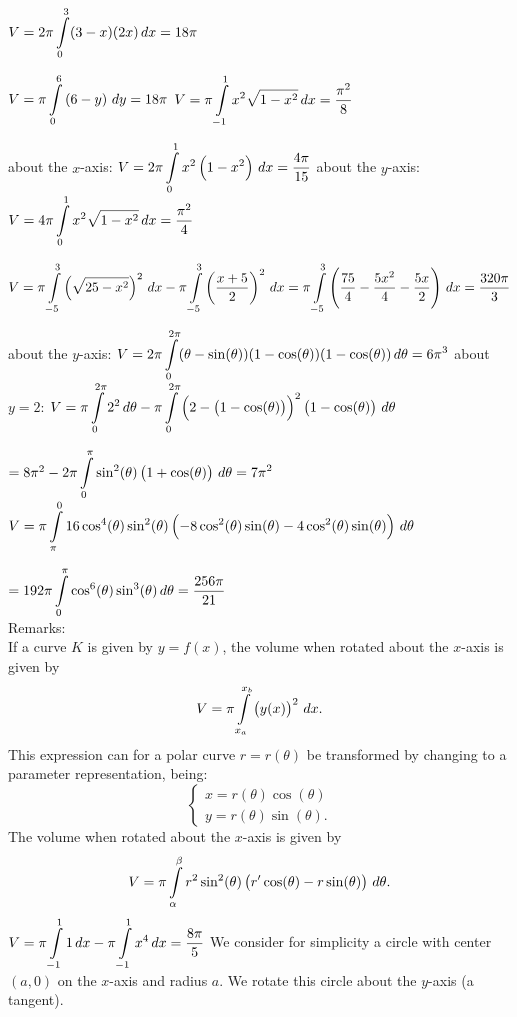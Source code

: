 \begin{Answer}
    
    \Question $V = 2\pi \displaystyle \int\limits_{0}^{3}(3-x)(2x) \, dx = 18 \pi $ 
    
    \ifcalculus
    \Question $V = \pi \displaystyle \int\limits_{0}^{6} \left(6-y\right) \, dy = 18 \pi$
    \Question $V= \pi \displaystyle \int\limits_{-1}^{1} x^2 \sqrt{1-x^2} \, dx = \dfrac{\pi^2}{8}$
    \fi
    
    \Question \subQuestion about the $x$-axis: $V = 2 \pi \displaystyle \int\limits_{0}^{1} x^2\left(1-x^2 \right) \, dx = \dfrac{4\pi}{15} $
    \subQuestion about the $y$-axis: $V = 4 \pi \displaystyle \int\limits_{0}^{1} x^2\sqrt{1-x^2} \, dx = \dfrac{\pi^2}{4} $  
    
    \ifcalculus
    \Question $V = \pi \displaystyle \int\limits_{-5}^{3}\left(\sqrt{25-x^2}\right)^2 \, dx - \pi \displaystyle \int\limits_{-5}^{3} \left(\dfrac{x+5}{2} \right)^2 \, dx =  \pi \displaystyle \int\limits_{-5}^{3}\left(\dfrac{75}{4} - \dfrac{5x^2}{4} - \dfrac{5x}{2} \right) \, dx = \dfrac{320 \pi}{3}  $
    
    \Question \subQuestion about the $y$-axis: $V = 2 \pi \displaystyle \int\limits_{0}^{2\pi} (\theta - \sin(\theta))(1-\cos(\theta))(1-\cos(\theta))  \, d\theta  = 6\pi^3$
    \subQuestion about $y=2$: $V = \pi \displaystyle \int\limits_{0}^{2\pi} 2^2 \, d\theta-  \pi \displaystyle \int\limits_{0}^{2\pi} \left( 2 - \left(1-\cos(\theta)\right) \right)^2\left(1-\cos(\theta)\right)  \, d\theta $ \par
    \hspace{3cm} $= 8 \pi^2 - 2 \pi \displaystyle \int\limits_{0}^{\pi} \sin^2(\theta)\left(1+\cos(\theta)\right)  \, d\theta = 7 \pi^2$
    \Question $V = 
    \pi \displaystyle \int\limits_{\pi}^{0} 16 \cos^4(\theta)\sin^2(\theta) \left( -8 \cos^2(\theta)\sin(\theta) -4 \cos^2(\theta)\sin(\theta) \right) \, d\theta$ \par
    \hspace{0.3cm} $=192 \pi \displaystyle \int\limits_{0}^{\pi} \cos^6(\theta)\sin^3(\theta) \, d\theta = \dfrac{256 \pi}{21}$ \\[0.2cm]
    Remarks: \\
    If a curve $K$ is given by $y=f(x)$, the volume when rotated about the $x$-axis is given by
    \[ V = \pi \displaystyle \int\limits_{x_a}^{x_b} \left( y(x) \right)^2 \, dx. \]
    This expression can for a polar curve $r=r(\theta)$ be transformed by changing to a parameter representation, being:
    \[ \left\{ \begin{array}{l} x = r(\theta) \cos(\theta) \\ y = r(\theta) \sin(\theta). \end{array} \right. \]
    The volume when rotated about the $x$-axis is given by
    \[  V = \pi \displaystyle \int\limits_{\alpha}^{\beta} r^2 \sin^2(\theta)\left( r' \cos(\theta) - r \sin(\theta) \right) \, d\theta.   \]
    \Question $V = \pi \displaystyle \int\limits_{-1}^{1} 1 \, dx - \pi \displaystyle \int\limits_{-1}^{1} x^4 \, dx = \dfrac{8 \pi}{5}$ 
    \Question We consider for simplicity a circle with center $(a,0)$ on the $x$-axis and radius $a$. We rotate this circle about the $y$-axis (a tangent). 
   

\end{Answer}
